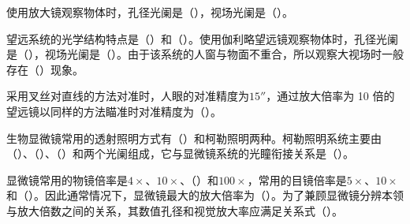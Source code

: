\documentclass[padl, analysis, notocnum]{ExBook}
\newcommand{\answerarea}[1][3.5cm]{%
  \par\vspace{1mm}%
  \noindent{\color{themeColor!35}\rule{\linewidth}{0.4pt}}\par
  \noindent\begin{minipage}[t][#1][t]{\linewidth}\vspace{0pt}\end{minipage}\par
  \noindent{\color{themeColor!35}\rule{\linewidth}{0.4pt}}\par
}
\begin{document}
\begin{qitems}[startnum=3]
\qitem 使用放大镜观察物体时，孔径光阑是（\hspace{1.6em}），视场光阑是（\hspace{1.6em}）。
\label{q:149:start}
\answerarea[4.0cm]
\label{q:149:end}
\end{qitems}

\begin{qitems}[startnum=4]
\qitem 望远系统的光学结构特点是（\hspace{1.6em}）和（\hspace{1.6em}）。使用伽利略望远镜观察物体时，孔径光阑是（\hspace{1.6em}），视场光阑是（\hspace{1.6em}）。由于该系统的人窗与物面不重合，所以观察大视场时一般存在（\hspace{1.6em}）现象。
\label{q:150:start}
\answerarea[4.0cm]
\label{q:150:end}
\end{qitems}

\begin{qitems}[startnum=5]
\qitem 采用叉丝对直线的方法对准时，人眼的对准精度为$15''$，通过放大倍率为 10 倍的望远镜以同样的方法瞄准时对准精度为（\hspace{1.6em}）。
\label{q:151:start}
\answerarea[4.0cm]
\label{q:151:end}
\end{qitems}

\begin{qitems}[startnum=6]
\qitem 生物显微镜常用的透射照明方式有（\hspace{1.6em}）和柯勒照明两种。柯勒照明系统主要由（\hspace{1.6em}）、（\hspace{1.6em}）、（\hspace{1.6em}）和两个光阑组成，它与显微镜系统的光瞳衔接关系是（\hspace{1.6em}）。
\label{q:152:start}
\answerarea[4.0cm]
\label{q:152:end}
\end{qitems}

\begin{qitems}[startnum=7]
\qitem 显微镜常用的物镜倍率是$4\times$、$10\times$、（\hspace{1.6em}）和$100\times$，常用的目镜倍率是$5\times$、$10\times$和（\hspace{1.6em}）。因此通常情况下，显微镜最大的放大倍率为（\hspace{1.6em}）。为了兼顾显微镜分辨本领与放大倍数之间的关系，其数值孔径和视觉放大率应满足关系式（\hspace{1.6em}）。
\label{q:153:start}
\answerarea[4.0cm]
\label{q:153:end}
\end{qitems}
\end{document}
